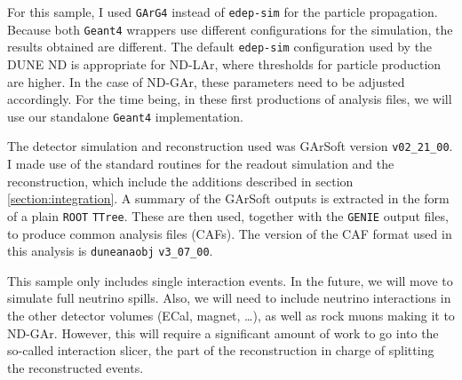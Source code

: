 For this sample, I used \texttt{GArG4} instead of \texttt{edep-sim} for the particle propagation. Because both \texttt{Geant4} wrappers use different configurations for the simulation, the results obtained are different. The default \texttt{edep-sim} configuration used by the DUNE ND is appropriate for ND-LAr, where thresholds for particle production are higher. In the case of ND-GAr, these parameters need to be adjusted accordingly. For the time being, in these first productions of analysis files, we will use our standalone \texttt{Geant4} implementation.

The detector simulation and reconstruction used was GArSoft version \texttt{v02_21_00}. I made use of the standard routines for the readout simulation and the reconstruction, which include the additions described in section \ref{section:integration}. A summary of the GArSoft outputs is extracted in the form of a plain \texttt{ROOT} \texttt{TTree}. These are then used, together with the \texttt{GENIE} output files, to produce common analysis files (CAFs). The version of the CAF format used in this analysis is \texttt{duneanaobj} \texttt{v3_07_00}.

This sample only includes single interaction events. In the future, we will move to simulate full neutrino spills. Also, we will need to include neutrino interactions in the other detector volumes (ECal, magnet, \dots), as well as rock muons making it to ND-GAr. However, this will require a significant amount of work to go into the so-called interaction slicer, the part of the reconstruction in charge of splitting the reconstructed events.

